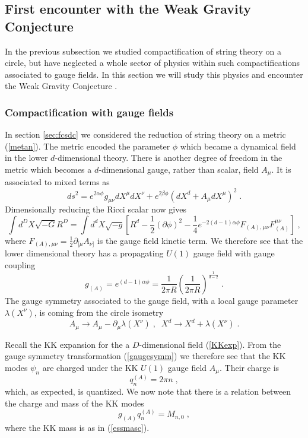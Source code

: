 \documentclass[11pt,a4paper]{article}
\numberwithin{equation}{section}
\numberwithin{table}{section}\setlength{\multlinegap}{25pt}
\newcommand{\be}{\begin{equation}}
\newcommand{\ee}{\end{equation}}
\begin{document}
\subsection{First encounter with the Weak Gravity Conjecture}
\label{sec:fewgcst}

In the previous subsection we studied compactification of string theory on a circle, but have neglected a whole sector of physics within such compactifications associated to gauge fields. In this section we will study this physics and encounter the Weak Gravity Conjecture \cite{ArkaniHamed:2006dz}. 

\subsubsection{Compactification with gauge fields}
\label{sec:fecompga}

In section \ref{sec:fcsdc} we considered the reduction of string theory on a metric (\ref{metan}). The metric encoded the parameter $\phi$ which became a dynamical field in the lower $d$-dimensional theory. There is another degree of freedom in the metric which becomes a $d$-dimensional gauge, rather than scalar, field $A_{\mu}$. It is associated to mixed terms as
\be
ds^2 = e^{2 \alpha \phi} g_{\mu\nu} dX^{\mu} dX^{\nu} + e^{2 \beta \phi} \left(dX^d + A_{\mu} dX^{\mu} \right)^2 \;.
\label{metana}
\ee 
Dimensionally reducing the Ricci scalar now gives
\be
\int d^DX \sqrt{-G}R^D = \int d^dX \sqrt{-g} \left[R^d - \frac12\left(\partial \phi \right)^2  - \frac14 e^{-2\left(d-1\right)\alpha \phi}F_{(A),\mu\nu}F_{(A)}^{\mu\nu}\right] \;,
\label{ddimA}
\ee
where $F_{(A),\mu\nu}=\frac12\partial_{[\mu}A_{\nu]}$ is the gauge field kinetic term. We therefore see that the lower dimensional theory has a propagating $U(1)$ gauge field with gauge coupling
\be
g_{(A)} = e^{\left(d-1\right)\alpha \phi} = \frac{1}{2 \pi R} \left(\frac{1}{2\pi R}\right)^{\frac{1}{d-2}}  \;.
\label{zmgc}
\ee 
The gauge symmetry associated to the gauge field, with a local gauge parameter $\lambda\left(X^{\nu}\right)$, is coming from the circle isometry
\be
A_{\mu} \rightarrow A_{\mu} - \partial_{\mu} \lambda\left(X^{\nu}\right) \;,\;\; X^d \rightarrow X^d + \lambda\left(X^{\nu}\right)\;.
\label{gaugesymm}
\ee

Recall the KK expansion for the a $D$-dimensional field (\ref{KKexp}). From the gauge symmetry transformation (\ref{gaugesymm}) we therefore see that the KK modes $\psi_n$ are charged under the KK $U(1)$ gauge field $A_{\mu}$. Their charge is
\be
q^{(A)}_n = 2 \pi n \;,
\ee
which, as expected, is quantized. We now note that there is a relation between the charge and mass of the KK modes
\be
g_{(A)} q^{(A)}_n  = M_{n,0} \;,
\label{eWGCe}
\ee
where the KK mass is as in (\ref{essmasc}).
\end{document}
